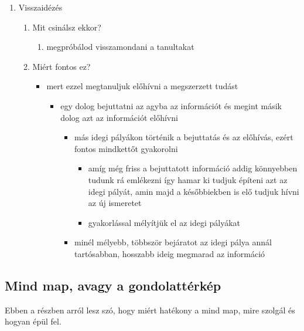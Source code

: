 \documentclass[../Main.tex]{subfiles}
\begin{document}
\begin{enumerate}
    \item Visszaidézés
    \begin{enumerate}
        \item Mit csinálsz ekkor?
        \begin{enumerate}
            \item megpróbálod visszamondani a tanultakat
        \end{enumerate}
        \item Miért fontos ez?
        \begin{itemize}
            \item mert ezzel megtanuljuk előhívni a megszerzett tudást
            \begin{itemize}
                \item egy dolog bejuttatni az agyba az információt és megint másik dolog azt az információt előhívni
                \begin{itemize}
                    \item más idegi pályákon történik a bejuttatás és az előhívás, ezért fontos mindkettőt gyakorolni
                    \begin{itemize}
                        \item amíg még friss a bejuttatott információ addig könnyebben tudunk rá emlékezni így hamar ki
                         tudjuk építeni azt az idegi pályát, amin majd a későbbiekben is elő tudjuk hívni az új ismeretet
                        \item gyakorlással mélyítjük el az idegi pályákat
                    \end{itemize}
                    \item minél mélyebb, többször bejáratot az idegi pálya annál tartósabban, hosszabb ideig megmarad az információ
                \end{itemize}
            \end{itemize}
        \end{itemize}
    \end{enumerate}
\end{enumerate}


\subsection{Mind map, avagy a gondolattérkép}

\begin{flushleft}
    Ebben a részben arról lesz szó, hogy miért hatékony a mind map, mire szolgál és hogyan épül fel.
\end{flushleft}
\end{document}
